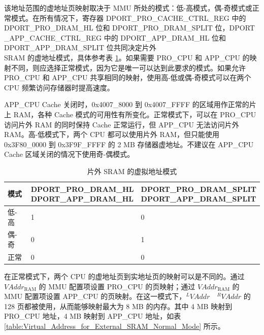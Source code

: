 该地址范围的虚地址页映射取决于 MMU 所处的模式：低-高模式，偶-奇模式或正常模式。在所有情况下，寄存器 DPORT\_PRO\_CACHE\_CTRL\_REG 中的 DPORT\_PRO\_DRAM\_HL 位和 DPORT\_PRO\_DRAM\_SPLIT 位，DPORT \_APP\_CACHE\_CTRL\_REG 中的 DPORT\_APP\_DRAM\_HL 位和 DPORT\_APP\_DRAM\_SPLIT 位共同决定片外\\SRAM 的虚地址模式，具体参考表 \ref{table:Virtual_Address_Mode_for_External_SRAM}。如果需要 PRO\_CPU 和 APP\_CPU 的映射不同，则应选择正常模式，因为它是唯一可以达到此要求的模式。如果允许 PRO\_CPU 和 APP\_CPU 共享相同的映射，使用高-低或偶-奇模式可以在两个 CPU 频繁访问存储器时提高速度。
 
APP\_CPU Cache 关闭时，0x4007\_8000 到 0x4007\_FFFF 的区域用作正常的片上 RAM，各种 Cache 模式的可用性有所变化。正常模式下，可以在 PRO\_CPU 访问片外 RAM 的同时保持 Cache 正常运行，但 APP\_CPU 无法访问片外 RAM。高-低模式下，两个 CPU 都可以使用片外 RAM，但只能使用 0x3F80\_0000 到 0x3F9F\_FFFF 的 2 MB 存储器虚地址。不建议在 APP\_CPU Cache 区域关闭的情况下使用奇-偶模式。


\begin{table}[H]
    \centering
    \caption{片外 SRAM 的虚拟地址模式}
    \label{table:Virtual_Address_Mode_for_External_SRAM}
     \begin{tabular}[h]{|p{4cm}|p{5.5cm}|p{5.5cm}|}
        \hline
        \rowcolor{lightgray}
       模式 &
        \makecell{DPORT\_PRO\_DRAM\_HL\\DPORT\_APP\_DRAM\_HL} &
        \makecell{DPORT\_PRO\_DRAM\_SPLIT\\DPORT\_APP\_DRAM\_SPLIT} \\
        \hline
        低-高 & 1 & 0 \\
        \hline
        偶-奇 & 0 & 1 \\
        \hline
        正常 & 0 & 0 \\
        \hline
    \end{tabular}
\end{table}

在正常模式下，两个 CPU 的虚地址页到实地址页的映射可以是不同的。通过 $VAddr_{\mathrm{RAM}}$ 的 MMU 配置项设置 PRO\_CPU 的页映射；通过 $VAddr_{\mathrm{RAM}}$ 的 MMU 配置项设置 APP\_CPU 的页映射。在这一模式下，$^{L}VAddr \quad ^{R}VAddr$ 的 128 页都被使用，从而能够映射最大为 8 MB 的内存。其中 4 MB 映射到 PRO\_CPU 地址，4 MB 映射到 APP\_CPU 地址，如表 \ref{table:Virtual_Address_for_External_SRAM_Normal_Mode} 所示。


